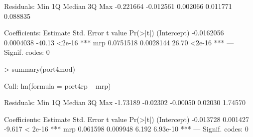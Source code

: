 \documentclass[12pt, a14paper, lithuanian]{article}
\begin{document}
\begin{Schunk}
\begin{Soutput}
Residuals:
      Min        1Q    Median        3Q       Max 
-0.221664 -0.012561  0.002066  0.011771  0.088835 

Coefficients:
              Estimate Std. Error t value Pr(>|t|)    
(Intercept) -0.0162056  0.0004038  -40.13   <2e-16 ***
mrp          0.0751518  0.0028144   26.70   <2e-16 ***
---
Signif. codes:  0 
\end{Soutput}
\begin{Sinput}
> summary(port4mod)
\end{Sinput}
\begin{Soutput}
Call:
lm(formula = port4rp ~ mrp)

Residuals:
     Min       1Q   Median       3Q      Max 
-1.73189 -0.02302 -0.00050  0.02030  1.74570 

Coefficients:
             Estimate Std. Error t value Pr(>|t|)    
(Intercept) -0.013728   0.001427  -9.617  < 2e-16 ***
mrp          0.061598   0.009948   6.192 6.93e-10 ***
---
Signif. codes:  0 
\end{Soutput}
\end{Schunk}
           
\end{document}
